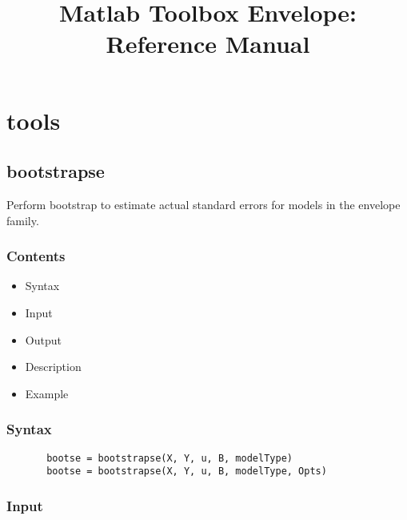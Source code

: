 \documentclass[a4paper,11pt,openany]{memoir}
\begin{document}
\title{Matlab Toolbox Envelope: Reference Manual}

\maketitle



\setcounter{tocdepth}{2}
\tableofcontents


\newpage


\chapter{tools}

\rmfamily
\color{black}\section{bootstrapse}

\begin{par}
Perform bootstrap to estimate actual standard errors for models in the envelope family.
\end{par} \vspace{1em}

\subsection*{Contents}

\begin{itemize}
\setlength{\itemsep}{-1ex}
   \item Syntax
   \item Input
   \item Output
   \item Description
   \item Example
\end{itemize}


\subsection*{Syntax}


\begin{verbatim}       bootse = bootstrapse(X, Y, u, B, modelType)
       bootse = bootstrapse(X, Y, u, B, modelType, Opts)\end{verbatim}
    

\subsection*{Input}
\end{document}
